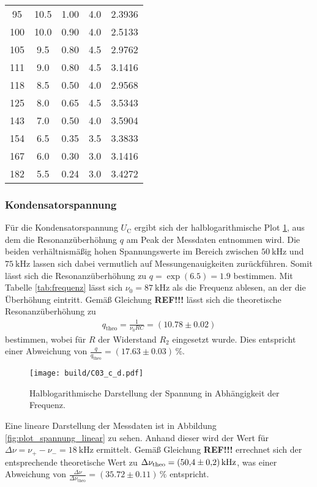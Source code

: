 \begin{table}[H]
\begin{tabular}{S[table-format = 3.0] S[table-format= 2.1] S[table-format = 1.2] S[table-format = 1.1] S[table-format = 1.4]}
         95 & 10.5 & 1.00 & 4.0 & 2.3936 \\
        100 & 10.0 & 0.90 & 4.0 & 2.5133 \\
        105 &  9.5 & 0.80 & 4.5 & 2.9762 \\
        111 &  9.0 & 0.80 & 4.5 & 3.1416 \\
        118 &  8.5 & 0.50 & 4.0 & 2.9568 \\
        125 &  8.0 & 0.65 & 4.5 & 3.5343 \\
        143 &  7.0 & 0.50 & 4.0 & 3.5904 \\
        154 &  6.5 & 0.35 & 3.5 & 3.3833 \\
        167 &  6.0 & 0.30 & 3.0 & 3.1416 \\
        182 &  5.5 & 0.24 & 3.0 & 3.4272 \\
        \bottomrule
    \end{tabular}
\end{table}
\noindent


\subsubsection{Kondensatorspannung}
Für die Kondensatorspannung $U_\text{C}$ ergibt sich der halblogarithmische Plot \ref{fig:plot_spannung}, aus dem die 
Resonanzüberhöhung $q$ am Peak der Messdaten entnommen wird.
Die beiden verhältnismäßig hohen Spannungswerte im Bereich zwischen $\qty{50}{\kilo\hertz}$ und $\qty{75}{\kilo\hertz}$
lassen sich dabei vermutlich auf Messungenauigkeiten zurückführen.
Somit lässt sich die Resonanzüberhöhung zu $q = \exp(6.5) = 1.9$ bestimmen. 
Mit Tabelle \ref{tab:frequenz} lässt sich $\nu_0 = \qty{87}{\kilo\hertz}$ als die Frequenz ablesen, an der die Überhöhung eintritt.
Gemäß Gleichung \textbf{REF!!!} lässt sich die theoretische Resonanzüberhöhung zu 
\begin{align}
    q_\text{theo} = \frac{1}{\nu_0 R C} = (\num{10.78} \pm \num{0.02})
\end{align}
bestimmen, wobei für $R$ der Widerstand $R_2$ eingesetzt wurde.
Dies entspricht einer Abweichung von $\frac{q}{q_\text{theo}} = (\num{17.63} \pm \num{0.03}) \, \%$.
\begin{figure}[H]
    \centering
    \texttt{[image: build/C03\_c\_d.pdf]}
    \caption{Halblogarithmische Darstellung der Spannung in Abhängigkeit der Frequenz.}
    \label{fig:plot_spannung}
\end{figure}

\noindent
Eine lineare Darstellung der Messdaten ist in Abbildung \ref{fig:plot_spannung_linear} zu sehen.
Anhand dieser wird der Wert für $\Delta \nu = \nu_+ -\nu_- = \qty{18}{\kilo\hertz}$ ermittelt.
Gemäß Gleichung \textbf{REF!!!} errechnet sich der entsprechende theoretische Wert zu 
$\Delta \nu_\text{theo} = (\num{50.4} \pm \num{0.2}) \, \unit{{\kilo\hertz}}$,
was einer Abweichung von $\frac{\Delta \nu}{\Delta \nu_\text{theo}} = (\num{35.72} \pm \num{0.11}) \, \%$ entspricht.

